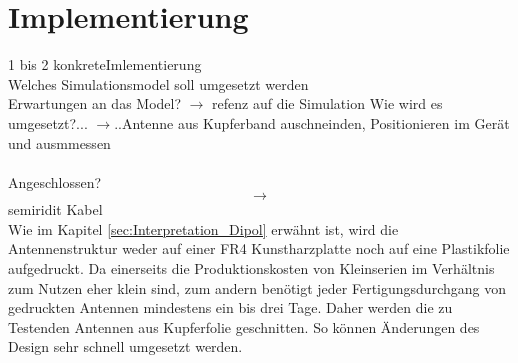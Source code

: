 \newpage 
\thispagestyle{empty}
\chapter{Implementierung}\label{sec:Implementierung}
1 bis 2 konkreteImlementierung\\
Welches Simulationsmodel soll umgesetzt werden\\
Erwartungen an das Model? $\rightarrow$ refenz auf die Simulation
Wie wird es umgesetzt?...  $\rightarrow$..Antenne aus Kupferband auschneinden, Positionieren im Gerät und ausmmessen\\
\\
Angeschlossen?$$\rightarrow$$ semiridit Kabel \\

Wie im Kapitel \ref{sec:Interpretation_Dipol} erwähnt ist, wird die Antennenstruktur weder auf einer FR4 Kunstharzplatte noch auf eine Plastikfolie aufgedruckt. Da einerseits die Produktionskosten von Kleinserien im Verhältnis zum Nutzen eher klein sind, zum andern benötigt jeder Fertigungsdurchgang von gedruckten Antennen  mindestens ein bis drei Tage. Daher werden die zu Testenden Antennen aus Kupferfolie geschnitten. So können Änderungen des Design sehr schnell umgesetzt werden.\\

